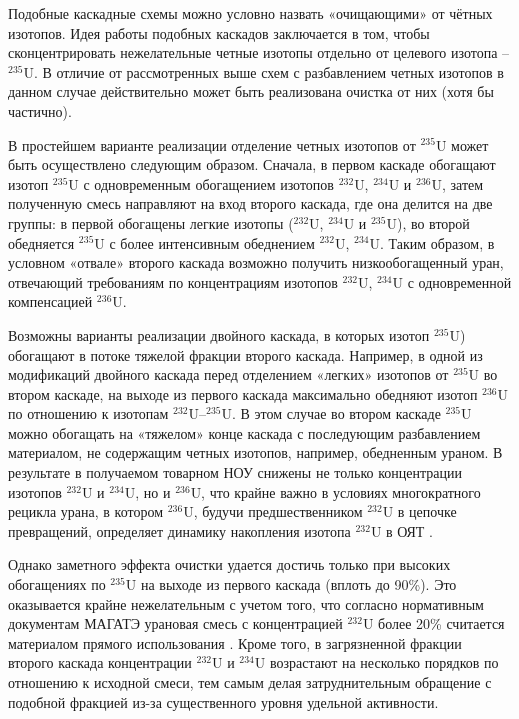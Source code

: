 Подобные каскадные схемы можно условно назвать «очищающими» от чётных изотопов. Идея работы подобных каскадов заключается в том, чтобы сконцентрировать нежелательные четные изотопы отдельно от целевого изотопа -- $^{235}$U. В отличие от рассмотренных выше схем с разбавлением четных изотопов в данном случае действительно может быть реализована очистка от них (хотя бы частично).

В простейшем варианте  реализации отделение четных изотопов от $^{235}$U может быть осуществлено следующим образом. Сначала, в первом каскаде обогащают изотоп $^{235}$U с одновременным обогащением изотопов $^{232}$U, $^{234}$U и $^{236}$U, затем полученную смесь направляют на вход второго каскада, где она делится на две группы: в первой обогащены легкие изотопы ($^{232}$U, $^{234}$U и $^{235}$U), во второй обедняется $^{235}$U с более интенсивным обеднением $^{232}$U, $^{234}$U. Таким образом, в условном «отвале» второго каскада возможно получить низкообогащенный уран, отвечающий требованиям по концентрациям изотопов $^{232}$U, $^{234}$U с одновременной компенсацией $^{236}$U.

Возможны варианты реализации двойного каскада, в которых изотоп $^{235}$U) обогащают в потоке тяжелой фракции второго каскада. Например, в одной из модификаций двойного каскада перед отделением «легких» изотопов от $^{235}$U во втором каскаде, на выходе из первого каскада максимально обедняют изотоп $^{236}$U по отношению к изотопам $^{232}$U–$^{235}$U. В этом случае во втором каскаде $^{235}$U можно обогащать на «тяжелом» конце каскада с последующим разбавлением материалом, не содержащим четных изотопов, например, обедненным ураном. В результате в получаемом товарном НОУ снижены не только концентрации изотопов $^{232}$U и $^{234}$U, но и $^{236}$U, что крайне важно в условиях многократного рецикла урана, в котором $^{236}$U, будучи предшественником $^{232}$U в цепочке превращений, определяет динамику накопления изотопа $^{232}$U в ОЯТ \cite{smirnovEvolutionIsotopicComposition2012}.

Однако заметного эффекта очистки удается достичь только при высоких обогащениях по $^{235}$U на выходе из первого каскада (вплоть до 90\%). Это оказывается крайне нежелательным с учетом того, что согласно нормативным документам МАГАТЭ урановая смесь с концентрацией $^{232}$U более 20\% считается материалом прямого использования \cite{ManagementHighEnriched2005}. Кроме того, в загрязненной фракции второго каскада концентрации $^{232}$U и $^{234}$U возрастают на несколько порядков по отношению к исходной смеси, тем самым делая затруднительным обращение с подобной фракцией из-за существенного уровня удельной активности.

